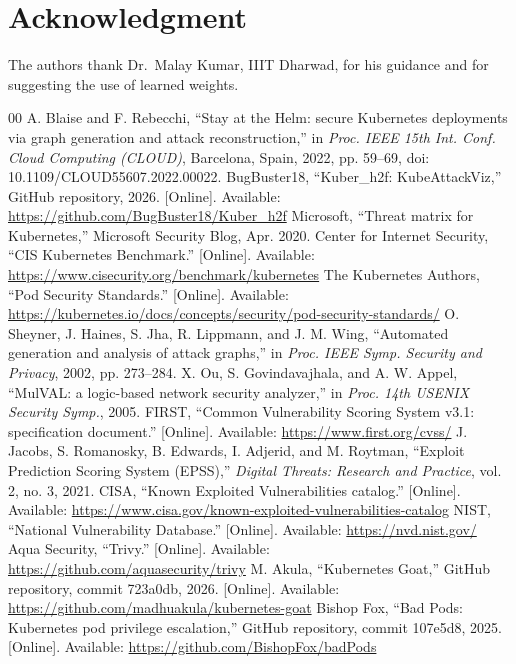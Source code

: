 \documentclass[conference]{IEEEtran}
\begin{document}
\section*{Acknowledgment}
The authors thank Dr.\ Malay Kumar, IIIT Dharwad, for his guidance and for suggesting the use of learned weights.

\begin{thebibliography}{00}
 A. Blaise and F. Rebecchi, ``Stay at the Helm: secure Kubernetes deployments via graph generation and attack
reconstruction,'' in \emph{Proc. IEEE 15th Int. Conf. Cloud Computing (CLOUD)}, Barcelona, Spain, 2022, pp. 59--69,
doi: 10.1109/CLOUD55607.2022.00022.
 BugBuster18, ``Kuber\_h2f: KubeAttackViz,'' GitHub repository, 2026. [Online]. Available:
\url{https://github.com/BugBuster18/Kuber_h2f}
 Microsoft, ``Threat matrix for Kubernetes,'' Microsoft Security Blog, Apr. 2020.
 Center for Internet Security, ``CIS Kubernetes Benchmark.'' [Online]. Available:
\url{https://www.cisecurity.org/benchmark/kubernetes}
 The Kubernetes Authors, ``Pod Security Standards.'' [Online]. Available:
\url{https://kubernetes.io/docs/concepts/security/pod-security-standards/}
 O. Sheyner, J. Haines, S. Jha, R. Lippmann, and J. M. Wing, ``Automated generation and analysis of attack
graphs,'' in \emph{Proc. IEEE Symp. Security and Privacy}, 2002, pp. 273--284.
 X. Ou, S. Govindavajhala, and A. W. Appel, ``MulVAL: a logic-based network security analyzer,'' in
\emph{Proc. 14th USENIX Security Symp.}, 2005.
 FIRST, ``Common Vulnerability Scoring System v3.1: specification document.'' [Online]. Available:
\url{https://www.first.org/cvss/}
 J. Jacobs, S. Romanosky, B. Edwards, I. Adjerid, and M. Roytman, ``Exploit Prediction Scoring System (EPSS),''
\emph{Digital Threats: Research and Practice}, vol. 2, no. 3, 2021.
 CISA, ``Known Exploited Vulnerabilities catalog.'' [Online]. Available:
\url{https://www.cisa.gov/known-exploited-vulnerabilities-catalog}
 NIST, ``National Vulnerability Database.'' [Online]. Available: \url{https://nvd.nist.gov/}
 Aqua Security, ``Trivy.'' [Online]. Available: \url{https://github.com/aquasecurity/trivy}
 M. Akula, ``Kubernetes Goat,'' GitHub repository, commit 723a0db, 2026. [Online]. Available:
\url{https://github.com/madhuakula/kubernetes-goat}
 Bishop Fox, ``Bad Pods: Kubernetes pod privilege escalation,'' GitHub repository, commit 107e5d8, 2025.
[Online]. Available: \url{https://github.com/BishopFox/badPods}
\end{thebibliography}
\end{document}
